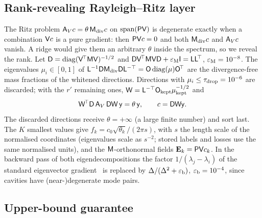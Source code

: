 \subsection{Rank-revealing Rayleigh--Ritz layer}\label{sec:04-ritz}

The Ritz problem $\Av c=\theta\,\Mdiv c$ on $\operatorname{span}(\mathsf{P}\mathsf{V})$ is degenerate exactly when a combination $\mathsf{V} c$ is a pure gradient: then $\mathsf{P}\mathsf{V} c=0$ and both $\Mdiv c$ and $\Av c$ vanish.
A ridge would give them an arbitrary $\theta$ inside the spectrum, so we reveal the rank.
Let $\mathsf D=\mathrm{diag}(\mathsf{V}^{\!\top}\mathsf{M}\mathsf{V})^{-1/2}$ and $\mathsf D\mathsf{V}^{\!\top}\mathsf{M}\mathsf{V}\mathsf D+\varepsilon_{\rm M}\mathsf I=\mathsf L\mathsf L^{\!\top}$, $\varepsilon_{\rm M}=10^{-8}$.
The eigenvalues $\mu_i\in[0,1]$ of $\mathsf L^{-1}\mathsf D\Mdiv\mathsf D\mathsf L^{-\top}=\mathsf O\,\mathrm{diag}(\mu)\mathsf O^{\!\top}$ are the divergence-free mass fractions of the whitened directions.
Directions with $\mu_i\le\tau_{\rm drop}=10^{-6}$ are discarded; with the $r'$ remaining ones, $\mathsf W=\mathsf L^{-\top}\mathsf O_{\rm kept}\mu_{\rm kept}^{-1/2}$ and
\begin{equation}\label{eq:04-ritz}
  \mathsf W^{\!\top}\mathsf D\,\Av\,\mathsf D\mathsf W\,\mathsf y=\theta\,\mathsf y,\qquad c=\mathsf D\mathsf W\mathsf y.
\end{equation}
The discarded directions receive $\theta=+\infty$ (a large finite number) and sort last.
The $K$ smallest values give $f_k=c_0\sqrt{\theta_k}/(2\pi s)$, with $s$ the length scale of the normalised coordinates (eigenvalues scale as $s^{-2}$; stored labels and losses use the same normalised units), and the $\mathsf{M}$-orthonormal fields $\mathbf{E}_k=\mathsf{P}\mathsf{V} c_k$.
In the backward pass of both eigendecompositions the factor $1/(\lambda_j-\lambda_i)$ of the standard eigenvector gradient~\cite{ionescu2015matrix,seeger2017autodiff} is replaced by $\Delta/(\Delta^2+\varepsilon_{\rm b})$, $\varepsilon_{\rm b}=10^{-4}$, since cavities have (near-)degenerate mode pairs.

\subsection{Upper-bound guarantee}\label{sec:04-bound}

